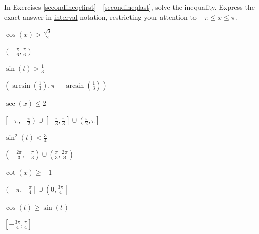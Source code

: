 \documentclass{ximera}
\begin{document}
\begin{question}
In Exercises \ref{secondineqefirst} - \ref{secondineqlast}, solve the inequality.  Express the exact answer in \underline{interval} notation, restricting your attention to $-\pi \leq x \leq \pi$.

\begin{problem} \label{secondineqefirst}
$\cos \left( x \right) > \frac{\sqrt{3}}{2}$ 

\begin{solution}
$\left( -\frac{\pi}{6}, \frac{\pi}{6} \right)$
\end{solution}
\end{problem}

\begin{problem}
$\sin(t) > \frac{1}{3}$

\begin{solution}
$\left( \arcsin\left(\frac{1}{3}\right), \pi - \arcsin\left(\frac{1}{3}\right) \right)$
\end{solution}
\end{problem}

\begin{problem} 
$\sec \left( x \right) \leq 2$

\begin{solution}
$\left[ -\pi, -\frac{\pi}{2} \right) \cup \left[ -\frac{\pi}{3}, \frac{\pi}{3} \right] \cup \left( \frac{\pi}{2}, \pi \right]$
\end{solution}
\end{problem}

\begin{problem}
$\sin^{2} \left( t \right) < \frac{3}{4}$

\begin{solution}
$\left( -\frac{2\pi}{3}, -\frac{\pi}{3} \right) \cup \left( \frac{\pi}{3}, \frac{2\pi}{3} \right)$
\end{solution}
\end{problem}

\begin{problem}
$\cot \left( x \right) \geq -1$

\begin{solution}
$\left( -\pi, -\frac{\pi}{4} \right] \cup \left( 0, \frac{3\pi}{4} \right]$
\end{solution}
\end{problem}

\begin{problem} \label{secondineqlast}
$\cos(t) \geq \sin(t)$

\begin{solution}
$\left[ -\frac{3\pi}{4}, \frac{\pi}{4} \right]$
\end{solution}
\end{problem}

\end{question}
\end{document}
